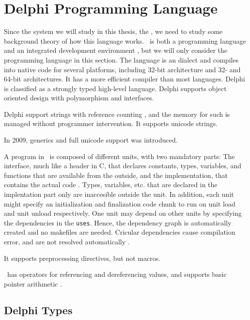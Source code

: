 \section{Delphi Programming Language}
\label{sec:Delphi Programming Language}
Since the system we will study in this thesis, the \gap, we need to study some background theory of how this language works. \delphi~is both a programming language and an integrated development environment \cite{Wikipedia_contributors2016-jk}, but we will only consider the programming language in this section. The language is an  dialect and compiles into native code for several platforms, including  32-bit architecture and  32- and 64-bit architectures. It has a more efficient compiler than most languages. Delphi is classified as a strongly typed high-level language. Delphi supports object oriented design with polymorphism and interfaces.

Delphi support strings with reference counting \cite{Wikipedia_contributors2016-jk}, and the memory for such is managed without programmer intervention. It supports unicode strings.

In 2009, generics and full unicode support was introduced.

A program in \delphi~is composed of different units, with two mandatory parts: The interface, much like a header in C, that declares constants, types, variables, and functions that are available from the outside, and the implementation, that contains the actual code \cite{noauthor_undated-pl}. Types, variables, etc. that are declared in the implentation part only are inaccesible outside the unit. In addition, each unit might specify an initialization and finalization code chunk to run on unit load and unit unload respectively. One unit may depend on other units by specifying the dependencies in the \texttt{uses}. Hence, the dependency graph is automatically created and no makefiles are needed. Cricular dependencies cause compilation error, and are not resolved automatically \cite{noauthor_undated-sp}.

It supports preprocessing directives, but not macros.

\delphi~has operators for referencing and dereferencing values, and supports basic pointer arithmetic \cite{noauthor_undated-cn}.

\subsection{Delphi Types}
\label{sub:Delphi Types}


